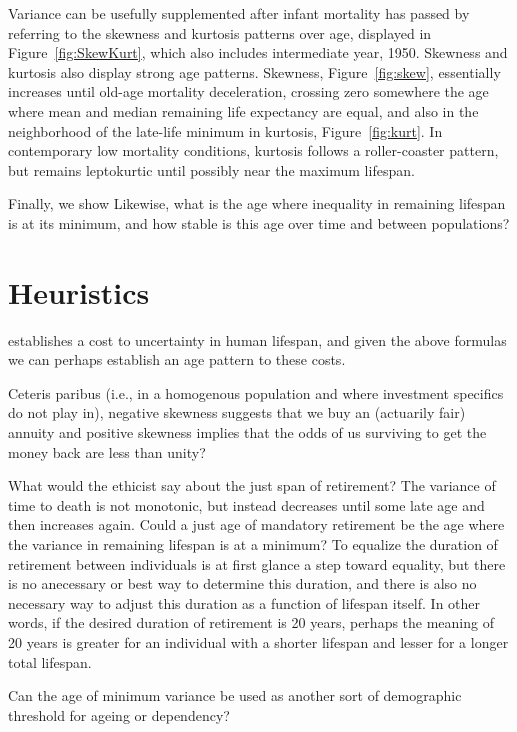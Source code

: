 \documentclass{article}
\begin{document}
Variance can be usefully supplemented after infant mortality
has passed by referring to the skewness and kurtosis patterns over age,
displayed in Figure~\ref{fig:SkewKurt}, which also includes intermediate year,
1950. Skewness and kurtosis also display strong age patterns. Skewness,
Figure~\ref{fig:skew}, essentially increases until old-age mortality
deceleration, crossing zero somewhere the age where mean and median remaining
life expectancy are equal, and also in the neighborhood of the late-life minimum
in kurtosis, Figure~\ref{fig:kurt}. In contemporary low mortality conditions,
kurtosis follows a roller-coaster pattern, but remains leptokurtic until
possibly near the maximum lifespan.

Finally, we show 
\FloatBarrier
Likewise, what is the age where inequality in remaining lifespan is at its
minimum, and how stable is this age over time and between populations?

\section*{Heuristics}
\citet{edwards2013cost} establishes a cost to uncertainty in human
lifespan, and given the above formulas we can perhaps establish an age
pattern to these costs.

Ceteris paribus (i.e., in a homogenous population and
where investment specifics do not play in), negative skewness suggests that we buy an (actuarily fair) annuity and positive skewness implies that the odds of us surviving to get the money back are less than unity?

What would the ethicist say about the just span of retirement? The variance of
time to death is not monotonic, but instead decreases until some late age and
then increases again. Could a just age of mandatory retirement be the age where
the variance in remaining lifespan is at a minimum? To equalize the duration of
retirement between individuals is at first glance a step toward equality, but
there is no anecessary or best way to determine this duration, and there is also
no necessary way to adjust this duration as a function of lifespan itself. In
other words, if the desired duration of retirement is 20 years, perhaps the
meaning of 20 years is greater for an individual with a shorter lifespan and
lesser for a longer total lifespan.

Can the age of minimum variance be used as another sort of demographic threshold
for ageing or dependency?


\end{document}
